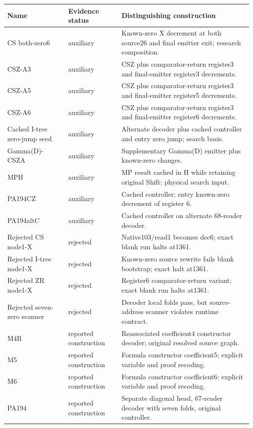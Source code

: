 \begin{longtable}{@{}p{.23\linewidth}p{.14\linewidth}p{.57\linewidth}@{}}
\toprule Name & Evidence status & Distinguishing construction\\\midrule\endhead
CS both-zero6 & auxiliary & Known-zero X decrement at both source26 and final emitter exit; research composition.\\
CSZ-A3 & auxiliary & CSZ plus comparator-return register3 and final-emitter register3 decrements.\\
CSZ-A5 & auxiliary & CSZ plus comparator-return register3 and final-emitter register5 decrements.\\
CSZ-A6 & auxiliary & CSZ plus comparator-return register3 and final-emitter register6 decrements.\\
Cached I-tree zero-jump seed & auxiliary & Alternate decoder plus cached controller and entry zero jump; search basis.\\
Gamma(D)-CSZA & auxiliary & Supplementary Gamma(D) emitter plus known-zero changes.\\
MPH & auxiliary & MP result cached in H while retaining original Shift; physical search input.\\
PA194CZ & auxiliary & Cached controller; entry known-zero decrement of register 6.\\
PA194altC & auxiliary & Cached controller on alternate 68-reader decoder.\\
Rejected CS node1-X & rejected & Native103/read1 becomes dec6; exact blank run halts at1361.\\
Rejected I-tree node1-X & rejected & Known-zero source rewrite fails blank bootstrap; exact halt at1361.\\
Rejected ZR node1-X & rejected & Register6 comparator-return variant; exact blank run halts at1361.\\
Rejected seven-zero scanner & rejected & Decoder local folds pass, but source-address scanner violates runtime contract.\\
M4R & reported construction & Reassociated coefficient4 constructor decoder; original resolved source graph.\\
M5 & reported construction & Formula constructor coefficient5; explicit variable and proof recoding.\\
M6 & reported construction & Formula constructor coefficient6; explicit variable and proof recoding.\\
PA194 & reported construction & Separate diagonal head, 67-reader decoder with seven folds, original controller.\\

\end{longtable}
